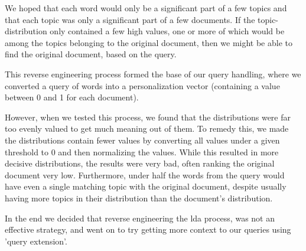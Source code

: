 We hoped that each word would only be a significant part of a few topics and that each topic was only a significant part of a few documents.
If the topic-distribution only contained a few high values, one or more of which would be among the topics belonging to the original document, then we might be able to find the original document, based on the query.

This reverse engineering process formed the base of our query handling, where we converted a query of words into a personalization vector (containing a value between 0 and 1 for each document).

However, when we tested this process, we found that the distributions were far too evenly valued to get much meaning out of them.
To remedy this, we made the distributions contain fewer values by converting all values under a given threshold to 0 and then normalizing the values.
While this resulted in more decisive distributions, the results were very bad, often ranking the original document very low.
Furthermore, under half the words from the query would have even a single matching topic with the original document, despite usually having more topics in their distribution than the document's distribution.
 
In the end we decided that reverse engineering the \gls{lda} process, was not an effective strategy, and went on to try getting more context to our queries using 'query extension'.
